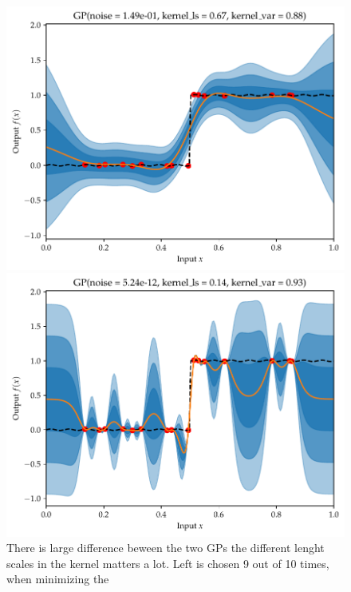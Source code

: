 \begin{figure}[H]
    \centering
    \begin{minipage}[b]{0.49\textwidth}
     \includegraphics[width=\textwidth]{Pictures/GP_vs_BNN1.pdf}
    \end{minipage}
    \hfill
    \begin{minipage}[b]{0.49\textwidth}
      \includegraphics[width=\textwidth]{Pictures/GP_vs_BNN1_b.pdf}
     \end{minipage}
     \caption{There is large difference beween the two GPs the different lenght scales in the kernel
     matters a lot. Left is chosen 9 out of 10 times, when minimizing the }
\end{figure}
